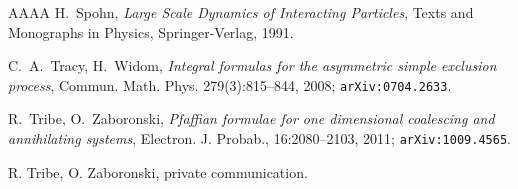 \documentclass[11pt,reqno]{amsart}
\theoremstyle{definition}
\theoremstyle{remark}
\theoremstyle{remark}
\numberwithin{equation}{section}
\begin{document}
\begin{thebibliography}{AAAA}
		H.~Spohn, \textit{Large Scale Dynamics of Interacting Particles}, Texts and Monographs in Physics, Springer-Verlag, 1991.
		
		C.~A.~Tracy, H.~Widom, \textit{Integral formulas for the asymmetric simple exclusion process},
		Commun. Math. Phys. 279(3):815--844, 2008; {\tt arXiv:0704.2633}.
		
		R.~Tribe, O.~Zaboronski, \textit{Pfaffian formulae for one dimensional coalescing and annihilating systems}, Electron. J. Probab., 16:2080--2103, 2011; {\tt arXiv:1009.4565}.
		
		 R. Tribe, O. Zaboronski, private communication.
		
	\end{thebibliography} 
	
	
\end{document}
